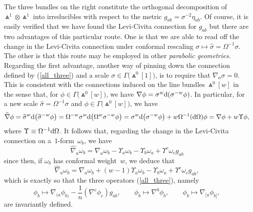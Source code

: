 \documentclass[pdftex]{sigma}%
\numberwithin{equation}{section}
\begin{document}
The three bundles on the right constitute the orthogonal decomposition of
$\Wedge^1\otimes\Wedge^1$ into irreducibles with respect to the metric
$g_{ab}=\sigma^{-2}\eta_{ab}$. Of course, it is easily verified that we have
found the Levi-Civita connection for $g_{ab}$ but there are two advantages of
this particular route. One is that we are able to read off the change in the
Levi-Civita connection under conformal rescaling
$\sigma\mapsto\widehat\sigma=\Omega^{-1}\sigma$. The other is that this route
may be employed in other {\em parabolic geometries}. Regarding the
first advantage, another way of pinning down the connection defined by
(\ref{all_three}) and a scale $\sigma\in\Gamma\big({\Wedge}^0[1]\big)$, is to require
that $\nabla_a\sigma=0$. This is consistent with the connections induced on
the line bundles $\Wedge^0[w]$ in the sense that, for
$\phi\in\Gamma\big({\Wedge}^0[w]\big)$, we have $\nabla\phi=\sigma^w{\rm d}(\sigma^{-w}\phi)$.
In particular, for a new scale $\widehat\sigma=\Omega^{-1}\sigma$ and
$\phi\in\Gamma\big({\Wedge}^0[w]\big)$, we have
\[\widehat\nabla\phi=\widehat\sigma^w {\rm d}\big(\widehat\sigma^{-w}\phi\big)=
\Omega^{-w}\sigma^w{\rm d}\big(\Omega^w\sigma^{-w}\phi\big)
=\sigma^w{\rm d}\big(\sigma^{-w}\phi\big)+w\Omega^{-1}({\rm d}\Omega)\phi
=\nabla\phi+w\Upsilon\phi,\]
where $\Upsilon\equiv\Omega^{-1}{\rm d}\Omega$. It follows that, regarding the
change in the Levi-Civita connection on a~$1$-form~$\omega_b$, we have
\[\widehat\nabla_a\omega_b
=\nabla_a\omega_b-\Upsilon_a\omega_b-\Upsilon_b\omega_a
+\Upsilon^c\omega_cg_{ab}\]
since then, if $\omega_b$ has conformal weight~$w$, we deduce that
\[\widehat\nabla_a\omega_b
=\nabla_a\omega_b+(w-1)\Upsilon_a\omega_b-\Upsilon_b\omega_a
+\Upsilon^c\omega_cg_{ab},\]
which is exactly so that the three operators (\ref{all_three}), namely
\[\textstyle
\phi_b\mapsto\nabla_{(a}\phi_{b)}-\frac1n(\nabla^c\phi_c)g_{ab},\qquad
\phi_b\mapsto\nabla^b\phi_b,\qquad\phi_b\mapsto\nabla_{[a}\phi_{b]},\]
are invariantly defined.
\end{document}
